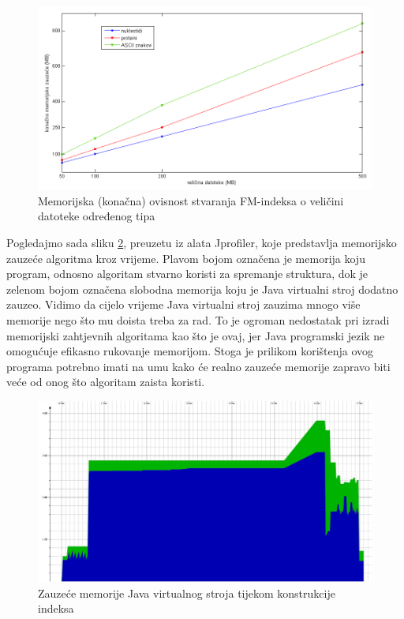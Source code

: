 \begin{figure}[H]
   \centering
       \includegraphics[width=\textwidth]{./pictures/test_mem_kon.png}
 \caption{Memorijska (konačna) ovisnost stvaranja FM-indeksa o veličini datoteke određenog tipa}
 \label{fig:test_mem_kon}
\end{figure}




Pogledajmo sada sliku \ref{fig:profiler}, preuzetu iz alata Jprofiler, koje predstavlja memorijsko zauzeće algoritma kroz vrijeme. Plavom bojom označena je memorija koju program, odnosno algoritam stvarno koristi za spremanje struktura, dok je zelenom bojom označena slobodna memorija koju je Java virtualni stroj dodatno zauzeo. Vidimo da cijelo vrijeme Java virtualni stroj zauzima mnogo više memorije nego što mu doista treba za rad. To je ogroman nedostatak pri izradi memorijski zahtjevnih algoritama kao što je ovaj, jer Java programski jezik ne omogućuje efikasno rukovanje memorijom. Stoga je prilikom korištenja ovog programa potrebno imati na umu kako će realno zauzeće memorije zapravo biti veće od onog što algoritam zaista koristi.

\begin{figure}[H]
   \centering
       \includegraphics[width=\linewidth]{./pictures/profiler.jpg}
 \caption{Zauzeće memorije Java virtualnog stroja tijekom konstrukcije indeksa}
 \label{fig:profiler}
\end{figure}
